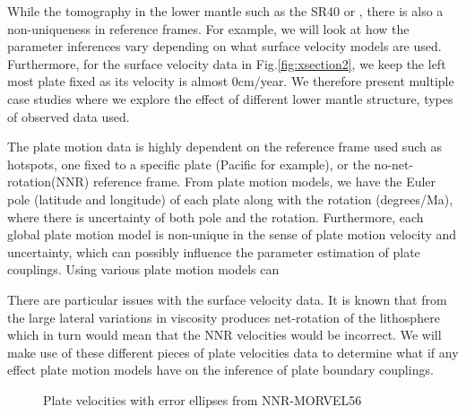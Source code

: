 \documentclass[12pt]{article}
\begin{document}
While the tomography in the lower mantle such as the SR40 or \citep{simmons2012llnl}, there is also a non-uniqueness in reference frames. For example, we will look at how the parameter inferences vary depending on what surface velocity models are used. Furthermore, for the surface velocity data in Fig.\ref{fig:xsection2}, we keep the left most plate fixed as its velocity is almost $0$cm/year. We therefore present multiple case studies where we explore the effect of different lower mantle structure, types of observed data used.

 The plate motion data is highly dependent on the reference frame used such as hotspots, one fixed to a specific plate (Pacific for example), or the no-net-rotation(NNR) reference frame. From plate motion models, we have the Euler pole (latitude and longitude) of each plate along with the rotation (degrees/Ma), where there is uncertainty of both pole and the rotation. Furthermore, each global plate motion model is non-unique in the sense of plate motion velocity and uncertainty, which can possibly influence the parameter estimation of plate couplings. Using various plate motion models can 
 
 There are particular issues with the surface velocity data. It is known that from the large lateral variations in viscosity produces net-rotation of the lithosphere which in turn would mean that the NNR velocities would be incorrect.  We will make use of these different pieces of plate velocities data to determine what if any effect plate motion models have on the inference of plate boundary couplings. 

\begin{figure}[H]
\centering
\hspace{-0.85cm}
\caption{Plate velocities with error ellipses from NNR-MORVEL56}
\label{fig:platevel}
\end{figure}
\end{document}
